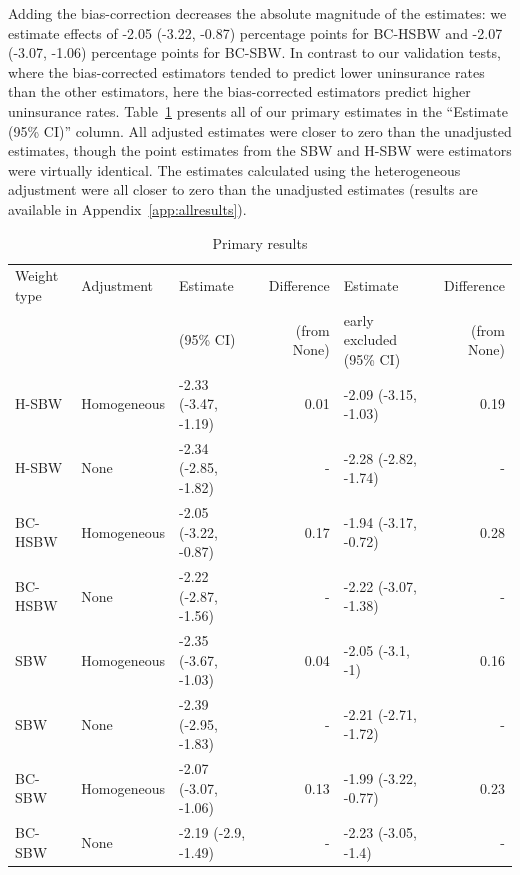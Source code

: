 \documentclass[aoas]{imsart}
\theoremstyle{plain}
\theoremstyle{remark}
\begin{document}
Adding the bias-correction decreases the absolute magnitude of the estimates: we estimate effects of -2.05 (-3.22, -0.87) percentage points for BC-HSBW and -2.07 (-3.07, -1.06) percentage points for BC-SBW. In contrast to our validation tests, where the bias-corrected estimators tended to predict lower uninsurance rates than the other estimators, here the bias-corrected estimators predict higher uninsurance rates. Table~\ref{tab:mainresults} presents all of our primary estimates in the ``Estimate (95\% CI)'' column. All adjusted estimates were closer to zero than the unadjusted estimates, though the point estimates from the SBW and H-SBW were estimators were virtually identical. The estimates calculated using the heterogeneous adjustment were all closer to zero than the unadjusted estimates (results are available in Appendix~\ref{app:allresults}).

\begin{table}[ht]
\caption{Primary results}\label{tab:mainresults}
\begin{tabular}{lllrlr}
  \hline
Weight type & Adjustment & Estimate  & Difference & Estimate  & Difference\\ 
 &  & (95\% CI) & (from None) & early excluded (95\% CI) & (from None) \\
  \hline
H-SBW & Homogeneous & -2.33 (-3.47, -1.19) & 0.01 & -2.09 (-3.15, -1.03) & 0.19 \\ 
  H-SBW & None & -2.34 (-2.85, -1.82) & - & -2.28 (-2.82, -1.74) & - \\ 
  BC-HSBW & Homogeneous & -2.05 (-3.22, -0.87) & 0.17 & -1.94 (-3.17, -0.72) & 0.28 \\ 
  BC-HSBW & None & -2.22 (-2.87, -1.56) & - & -2.22 (-3.07, -1.38) & - \\ 
  SBW & Homogeneous & -2.35 (-3.67, -1.03) & 0.04 & -2.05 (-3.1, -1) & 0.16 \\ 
  SBW & None & -2.39 (-2.95, -1.83) & - & -2.21 (-2.71, -1.72) & - \\ 
  BC-SBW & Homogeneous & -2.07 (-3.07, -1.06) & 0.13 & -1.99 (-3.22, -0.77) & 0.23 \\ 
  BC-SBW & None & -2.19 (-2.9, -1.49) & - & -2.23 (-3.05, -1.4) & - \\ 
   \hline
\end{tabular}
\end{table}
\end{document}
